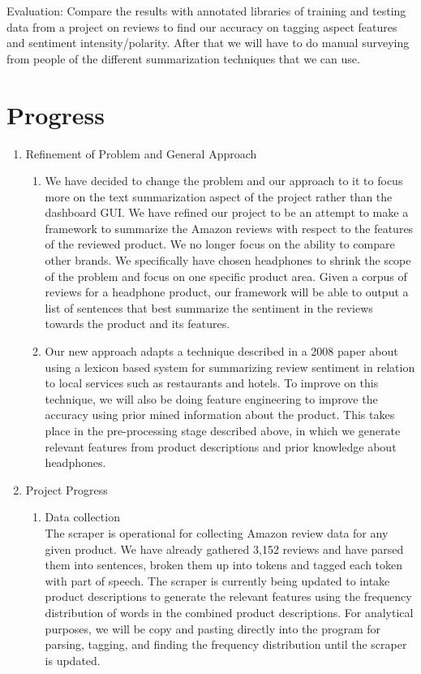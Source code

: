 \documentclass{article}
\begin{document}
Evaluation: Compare the results with annotated libraries of training and testing data from a project on reviews to find our accuracy on tagging aspect features and sentiment intensity/polarity.
After that we will have to do manual surveying from people of the different summarization techniques that we can use.
\section{Progress}
\begin{enumerate}
\item Refinement of Problem and General Approach
	\begin{enumerate} [label* = \arabic*.]
	\item We have decided to change the problem and our approach to it to focus more on the text summarization aspect of the project rather than the dashboard GUI. We have refined our project to be an attempt to make a framework to summarize the Amazon reviews with respect to the features of the reviewed product. We no longer focus on the ability to compare other brands. We specifically have chosen headphones to shrink the scope of the problem and focus on one specific product area. Given a corpus of reviews for a headphone product, our framework will be able to output a list of sentences that best summarize the sentiment in the reviews towards the product and its features.
	\item Our new approach adapts a technique described in a 2008 paper about using a lexicon based system for summarizing review sentiment in relation to local services such as restaurants and hotels. To improve on this technique, we will also be doing feature engineering to improve the accuracy using prior mined information about the product. This takes place in the pre-processing stage described above, in which we generate relevant features from product descriptions and prior knowledge about headphones.
	\end{enumerate}
\item Project Progress \\
	\begin{enumerate} [label* = \arabic*.]
	\item Data collection \\
	The scraper is operational for collecting Amazon review data for any given product. We have already gathered 3,152 reviews and have parsed them into sentences, broken them up into tokens and tagged each token with part of speech. The scraper is currently being updated to intake product descriptions to generate the relevant features using the frequency distribution of words in the combined product descriptions. For analytical purposes, we will be copy and pasting directly into the program for parsing, tagging, and finding the frequency distribution until the scraper is updated. 

\end{enumerate}
\end{enumerate}
\end{document}
